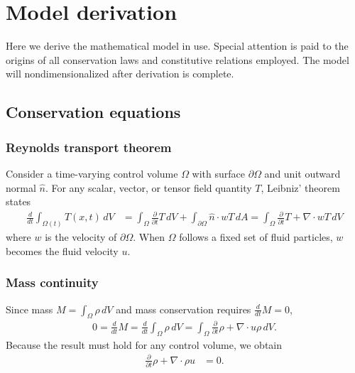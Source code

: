 \documentclass[letterpaper,11pt,nointlimits]{amsart}
\begin{document}
\section{Model derivation}

Here we derive the mathematical model in use.  Special attention is
paid to the origins of all conservation laws and constitutive relations
employed.  The model will nondimensionalized after derivation is complete.

\subsection{Conservation equations}

\subsubsection{Reynolds transport theorem}

Consider a time-varying control volume $\Omega$ with surface
$\partial\Omega$ and unit outward normal $\hat{n}$.  For any 
scalar, vector, or tensor field quantity
$T$, Leibniz' theorem states
\begin{align}
  \label{eq:rtt}
  \frac{d}{dt}\int_{\Omega(t)}T(x,t)\,dV
  &=
  \int_{\Omega}\frac{\partial}{\partial{}t}T\,dV
  +
  \int_{\partial\Omega} \hat{n}\cdot{}w T\,dA
  =
  \int_{\Omega}\frac{\partial}{\partial{}t}T+\nabla\cdot{}wT\,dV
\end{align}
where $w$ is the velocity of $\partial\Omega$.  When $\Omega$ follows
a fixed set of fluid particles, $w$ becomes the fluid velocity $u$.

\subsubsection{Mass continuity} 
Since mass $M=\int_{\Omega} \rho\,dV$
and mass conservation requires $\frac{d}{dt}M=0$,
\begin{align}
  0 = \frac{d}{dt}M 
  = \frac{d}{dt}\int_{\Omega} \rho\,dV
  =
  \int_{\Omega}\frac{\partial}{\partial{}t}\rho+\nabla\cdot{}u\rho{}\,dV.
\end{align}
Because the result must hold for any control volume, we obtain
\begin{align}
  \label{eq:cons_mass}
  \frac{\partial}{\partial{}t}\rho+\nabla\cdot\rho{}u &= 0
  .
\end{align}
\end{document}
